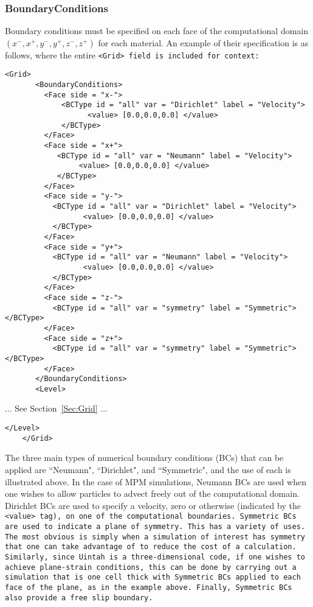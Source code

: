\subsubsection{BoundaryConditions} \label{Sec:MPM_BCs}

Boundary conditions must be specified on each face of the computational
domain $(x^-, x^+, y^-, y^+,z^-,z^+)$ for each material.  An example of their
specification is as follows, where the entire \tt <Grid> \normalfont field
is included for context:
\begin{Verbatim}[fontsize=\footnotesize]
    <Grid>
       <BoundaryConditions>
         <Face side = "x-">
             <BCType id = "all" var = "Dirichlet" label = "Velocity">
                   <value> [0.0,0.0,0.0] </value>
             </BCType>
         </Face>
         <Face side = "x+">
            <BCType id = "all" var = "Neumann" label = "Velocity">
                 <value> [0.0,0.0,0.0] </value>
            </BCType>
         </Face>
         <Face side = "y-">
           <BCType id = "all" var = "Dirichlet" label = "Velocity">
                  <value> [0.0,0.0,0.0] </value>
           </BCType>
         </Face>
         <Face side = "y+">
           <BCType id = "all" var = "Neumann" label = "Velocity">
                  <value> [0.0,0.0,0.0] </value>
           </BCType>
         </Face>
         <Face side = "z-">
           <BCType id = "all" var = "symmetry" label = "Symmetric"> </BCType>
         </Face>
         <Face side = "z+">
           <BCType id = "all" var = "symmetry" label = "Symmetric"> </BCType>
         </Face>
       </BoundaryConditions>
       <Level>
\end{Verbatim}

... See Section~\ref{Sec:Grid} ...

\begin{Verbatim}[fontsize=\footnotesize]
       </Level>
    </Grid>
\end{Verbatim}

The three main types of numerical boundary conditions (BCs) that can
be applied are ``Neumann", ``Dirichlet", and ``Symmetric", and the use of
each is illustrated above.  In the case of
MPM simulations, Neumann BCs are used when one wishes to allow particles to
advect freely out of the computational domain.  Dirichlet BCs are used to
specify a velocity, zero or otherwise (indicated by the \tt <value> \normalfont
tag), on one of the computational boundaries.
Symmetric BCs are used to indicate a plane of symmetry.  This has a variety
of uses.  The most obvious is simply when a simulation of interest has symmetry
that one can take advantage of to reduce the cost of a calculation.  Similarly,
since Uintah is a three-dimensional code, if one wishes to achieve plane-strain
conditions, this can be done by carrying out a simulation that is one cell thick
with Symmetric BCs applied to each face of the plane, as in the example above.
Finally, Symmetric BCs also provide a free slip boundary.

